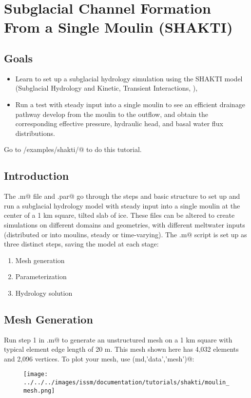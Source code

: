 \section{Subglacial Channel Formation From a Single Moulin (SHAKTI)}
\subsection{Goals} %
\begin{itemize}
	\item Learn to set up a subglacial hydrology simulation using the SHAKTI model (Subglacial Hydrology and Kinetic, Transient Interactions, \cite{Sommers2018}),
	\item Run a test with steady input into a single moulin to see an efficient drainage pathway develop from the moulin to the outflow, and obtain the corresponding effective pressure, hydraulic head, and basal water flux distributions.
\end{itemize} 

Go to \verb@trunk/examples/shakti/@ to do this tutorial.
\subsection{Introduction}
The \verb@runme.m@ file and \verb@moulin.par@ go through the steps and basic structure to set up and run a subglacial hydrology model with steady input into a single moulin at the center of a 1 km square, tilted slab of ice. These files can be altered to create simulations on different domains and geometries, with different meltwater inputs (distributed or into moulins, steady or time-varying). The \verb@runme.m@ script is set up as three distinct steps, saving the model at each stage:
\begin{enumerate}
	\item Mesh generation
	\item Parameterization
	\item Hydrology solution
\end{enumerate}

\subsection{Mesh Generation}
Run step 1 in \verb@runme.m@ to generate an unstructured mesh on a 1 km square with typical element edge length of 20 m. This mesh shown here has 4,032 elements and 2,096 vertices. To plot your mesh, use \verb@plotmodel(md,'data','mesh')@:
\begin{figure}[H]
	\begin{center}
		\texttt{[image: ../../../images/issm/documentation/tutorials/shakti/moulin\_mesh.png]}
	\end{center}
\end{figure}


